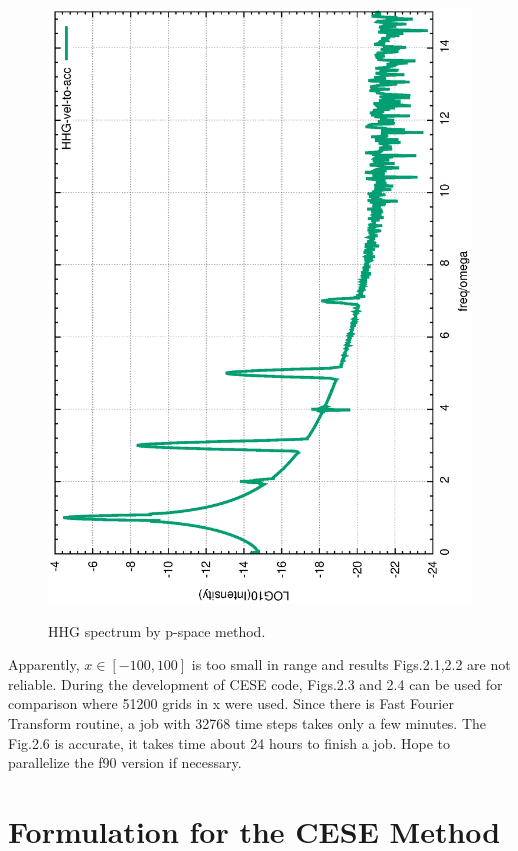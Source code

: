 \documentclass{isildur}
\begin{document}
\begin{itemize}
\begin{figure}[htbp]
{{{\includegraphics[width=\linewidth]{fig3b.eps}} }}
\caption{HHG spectrum by p-space method.
 }
\end{figure}

Apparently, $ x\in[-100,100]$ is too small in range and results Figs.2.1,2.2
are not reliable.
%
During the development of CESE code, Figs.2.3 and 2.4 can be used for
comparison where 51200 grids in x were used. Since there is Fast Fourier
Transform routine, a job with 32768 time steps takes only a few minutes.
%
The Fig.2.6 is accurate, it takes time about 24 hours to finish a job. Hope to
parallelize the f90 version if necessary.

\end{itemize}

\chapter{Formulation for the CESE Method}
\label{c:cesef}
\end{document}
